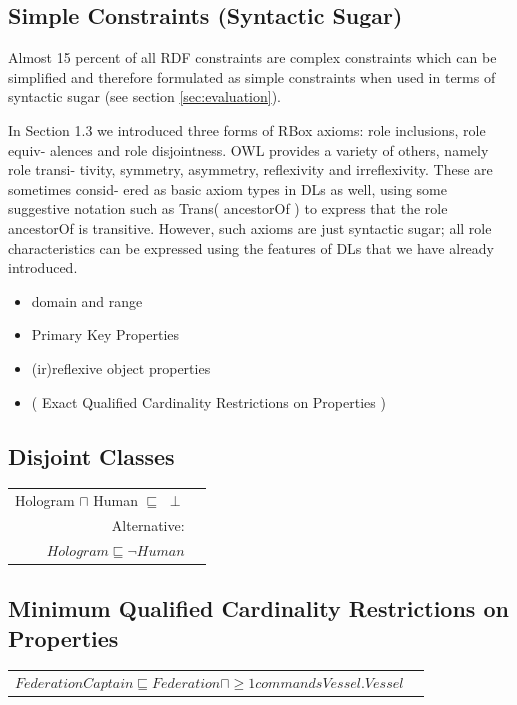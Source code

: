 \documentclass{llncs}
\newenvironment{DL}{
	\begin{center}
  \begin{tabular}{r l}

}{
  \end{tabular}
	\end{center}
}
\begin{document}
\subsection{Simple Constraints (Syntactic Sugar)}

Almost 15 percent of all RDF constraints are complex constraints which can be simplified and therefore formulated as simple constraints when used in terms of syntactic sugar (see section \ref{sec:evaluation}).

In Section 1.3 we introduced three forms of RBox axioms: role inclusions, role equiv-
alences and role disjointness. OWL provides a variety of others, namely role transi-
tivity, symmetry, asymmetry, reflexivity and irreflexivity. These are sometimes consid-
ered as basic axiom types in DLs as well, using some suggestive notation such as
Trans( ancestorOf ) to express that the role ancestorOf is transitive. However, such axioms
are just syntactic sugar; all role characteristics can be expressed using the features
of DLs that we have already introduced.

\begin{itemize}
  \item domain and range
	\item Primary Key Properties
	\item (ir)reflexive object properties
	\item ( Exact Qualified Cardinality Restrictions on Properties )
\end{itemize}

\subsection{Disjoint Classes}

\begin{DL}
Hologram $\sqcap$ Human $\sqsubseteq$ $\perp$\\
Alternative:\\
$Hologram \sqsubseteq \neg Human$
\end{DL}

\subsection{Minimum Qualified Cardinality Restrictions on Properties}

\begin{DL}
$FederationCaptain \sqsubseteq Federation \sqcap \geq1 commandsVessel . Vessel $
\end{DL}
\end{document}
